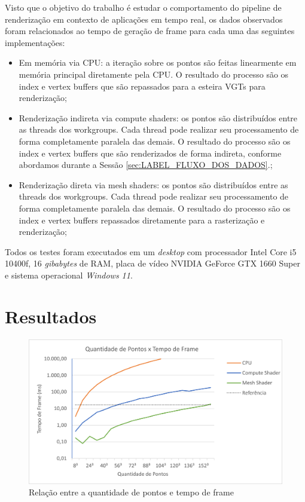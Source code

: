 Visto que o objetivo do trabalho é estudar o comportamento do pipeline de renderização em contexto de aplicações em tempo real, os dados observados foram relacionados ao tempo de geração de frame para cada uma das seguintes implementações:

\begin{itemize}
    \item Em memória via CPU: a iteração sobre os pontos são feitas linearmente em memória principal diretamente pela CPU. O resultado do processo são os index e vertex buffers que são repassados para a esteira VGTs para renderização;
    \item Renderização indireta via compute shaders: os pontos são distribuídos entre as threads dos workgroups. Cada thread pode realizar seu processamento de forma completamente paralela das demais. O resultado do processo são os index e vertex buffers que são renderizados de forma indireta, conforme abordamos durante a Sessão \ref{sec:LABEL_FLUXO_DOS_DADOS}.;
    \item Renderização direta via mesh shaders: os pontos são distribuídos entre as threads dos workgroups. Cada thread pode realizar seu processamento de forma completamente paralela das demais. O resultado do processo são os index e vertex buffers repassados diretamente para a rasterização e renderização;
\end{itemize}

Todos os testes foram executados em um \textit{desktop} com processador Intel Core i5 10400f, 16 \textit{gibabytes} de RAM, placa de vídeo NVIDIA GeForce GTX 1660 Super e sistema operacional \textit{Windows 11}. 

\section{Resultados}\label{sec:LABEL_RESULTADOS}

\begin{figure}
\centering
\includegraphics[width=1\textwidth]{imagens/PontosXTempoFrame.png}
\caption{Relação entre a quantidade de pontos e tempo de frame}
\label{fig:LABEL_FIG_PONTOS_X_TEMPO}
\end{figure}

